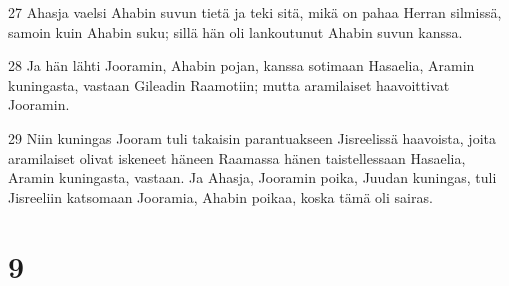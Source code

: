 \par 27 Ahasja vaelsi Ahabin suvun tietä ja teki sitä, mikä on pahaa Herran silmissä, samoin kuin Ahabin suku; sillä hän oli lankoutunut Ahabin suvun kanssa.
\par 28 Ja hän lähti Jooramin, Ahabin pojan, kanssa sotimaan Hasaelia, Aramin kuningasta, vastaan Gileadin Raamotiin; mutta aramilaiset haavoittivat Jooramin.
\par 29 Niin kuningas Jooram tuli takaisin parantuakseen Jisreelissä haavoista, joita aramilaiset olivat iskeneet häneen Raamassa hänen taistellessaan Hasaelia, Aramin kuningasta, vastaan. Ja Ahasja, Jooramin poika, Juudan kuningas, tuli Jisreeliin katsomaan Jooramia, Ahabin poikaa, koska tämä oli sairas.

\chapter{9}

